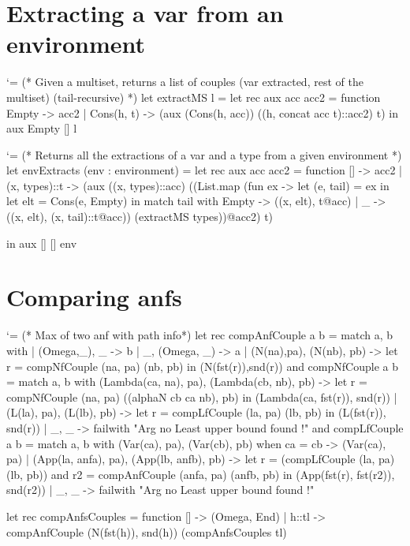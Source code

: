 \documentclass{article}
\let\origlstlisting=\lstlisting
\let\endoriglstlisting=\endlstlisting
\renewenvironment{lstlisting}
{\mathcode`\-=\hyphenmathcode
    \everymath{}\mathsurround=0pt\origlstlisting}
{\endoriglstlisting}
\begin{document}
\newpage
\appendix
{}
\section{Extracting a var from an environment}
\label{a_extract}
\begin{lstlisting}
(* Given a multiset, returns a list of couples (var extracted, rest of the multiset) 
                (tail-recursive) *)
let extractMS l =
  let rec aux acc acc2 = function
    Empty -> acc2
    | Cons(h, t) -> (aux (Cons(h, acc)) ((h, concat acc t)::acc2) t)
in aux Empty [] l
\end{lstlisting}


\begin{lstlisting}
(* Returns all the extractions of a var and a type from a given  environment *)
let envExtracts (env : environment) = 
  let rec aux acc acc2 = function
    [] -> acc2
    | (x, types)::t -> 
        (aux ((x, types)::acc) ((List.map (fun ex -> 
            let (e, tail) = ex in 
            let elt = Cons(e, Empty) in 
            match tail with
              Empty -> ((x, elt), t@acc)
              | _ -> ((x, elt), (x, tail)::t@acc)) (extractMS types))@acc2) t) 

  in aux [] [] env
\end{lstlisting}
\section{Comparing anfs}
\label{a_anf}
\begin{lstlisting}
(* Max of two anf with path info*)
let rec compAnfCouple a b = match a, b with
  | (Omega,_), _ -> b
  |  _, (Omega, _) -> a
  | (N(na),pa), (N(nb), pb) -> let r = compNfCouple (na, pa) (nb, pb) in 
                               (N(fst(r)),snd(r))
and compNfCouple a b =  match a, b with
    (Lambda(ca, na), pa), (Lambda(cb, nb), pb) -> 
        let r = compNfCouple (na, pa) ((alphaN cb ca nb), pb) in
			(Lambda(ca, fst(r)), snd(r))
  | (L(la), pa), (L(lb), pb) -> let r = compLfCouple (la, pa) (lb, pb) in 
                                (L(fst(r)), snd(r))
  | _, _ -> failwith "Arg no Least upper bound found !"
and compLfCouple a b = match a, b with
    (Var(ca), pa), (Var(cb), pb) when ca = cb -> (Var(ca), pa)
  | (App(la, anfa), pa), (App(lb, anfb), pb) -> let r = (compLfCouple (la, pa) (lb, pb))
  and r2 = compAnfCouple (anfa, pa) (anfb, pb) in (App(fst(r), fst(r2)), snd(r2))
  | _, _ -> failwith "Arg no Least upper bound found !"

let rec compAnfsCouples = function
[] -> (Omega, End)
 | h::tl -> compAnfCouple (N(fst(h)), snd(h)) (compAnfsCouples tl)
\end{lstlisting}
\newpage
\end{document}
